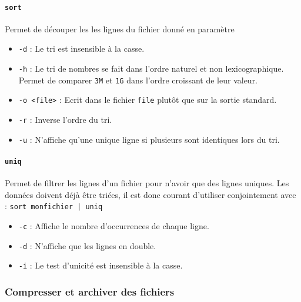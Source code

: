 \paragraph{\texttt{sort}} 
Permet de découper les les lignes du fichier donné en paramètre
\begin{itemize}
    \item \texttt{-d} : Le tri est insensible à la casse.
    \item \texttt{-h} : Le tri de nombres se fait dans l'ordre naturel et non lexicographique. Permet de comparer \texttt{3M} et \texttt{1G} dans l'ordre croissant de leur valeur.
    \item \texttt{-o <file>} : Ecrit dans le fichier \texttt{file} plutôt que sur la sortie standard.
    \item \texttt{-r} : Inverse l'ordre du tri.
    \item \texttt{-u} : N'affiche qu'une unique ligne si plusieurs sont identiques lors du tri.
\end{itemize}

\paragraph{\texttt{uniq}} 
Permet de filtrer les lignes d'un fichier pour n'avoir que des lignes uniques. Les données doivent déjà être triées, il est donc courant d'utiliser  conjointement avec  : \newline \texttt{sort monfichier | uniq}
\begin{itemize}
    \item \texttt{-c} : Affiche le nombre d'occurrences de chaque ligne.
    \item \texttt{-d} : N'affiche que les lignes en double.
    \item \texttt{-i} : Le test d'unicité est insensible à la casse.
\end{itemize}

\newpage

\subsubsection{Compresser et archiver des fichiers}

